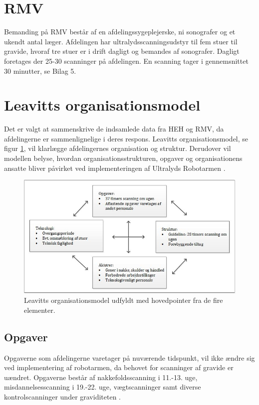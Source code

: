 \section{RMV}
Bemanding på RMV består af en afdelingssygeplejerske, ni sonografer og et ukendt antal læger. Afdelingen har ultralydsscanningsudstyr til fem stuer til gravide, hvoraf tre stuer er i drift dagligt og bemandes af sonografer. Dagligt foretages der 25-30 scanninger på afdelingen. En scanning tager i gennemsnittet 30 minutter, se Bilag 5.

\section{Leavitts organisationsmodel}
Det er valgt at sammenskrive de indsamlede data fra HEH og RMV, da afdelingerne er sammenlignelige i deres respons. Leavitts organisationsmodel, se figur \ref{DiamantModelVores}, vil klarlægge afdelingernes organisation og struktur. Derudover vil modellen belyse, hvordan organisationsstrukturen, opgaver og organisationens ansatte bliver påvirket ved implementeringen af Ultralyds Robotarmen \cite{Leavitt}\cite{diamantmodel}.
\begin{figure}[h!]\centering
	\includegraphics[width = 1.0\textwidth]{Figurer/leavitts_udfyldt.jpg}
	\caption{Leavitts organisationsmodel udfyldt med hovedpointer fra de fire elementer.}
	\label{DiamantModelVores}
\end{figure}

\subsection{Opgaver} \label{opgaver_organisation}
Opgaverne som afdelingerne varetager på nuværende tidspunkt, vil ikke ændre sig ved implementering af robotarmen, da behovet for scanninger af gravide er uændret. Opgaverne består af nakkefoldsscanning i 11.-13. uge, misdannelsesscanning i 19.-22. uge, vægtscanninger samt diverse kontrolscanninger under graviditeten \cite{graviditet}. 

